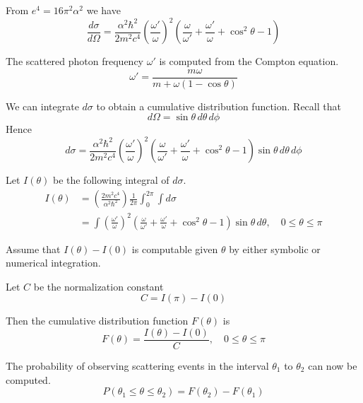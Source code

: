 \documentclass[12pt]{article}
\begin{document}
\noindent
From $e^4=16\pi^2\alpha^2$ we have
\begin{equation*}
\frac{d\sigma}{d\Omega}
=\frac{\alpha^2\hbar^2}{2m^2c^4}
\left(\frac{\omega'}{\omega}\right)^2
\left(
\frac{\omega}{\omega'}+\frac{\omega'}{\omega}+\cos^2\theta-1
\right)
\end{equation*}

\noindent
The scattered photon frequency $\omega'$ is computed from the Compton equation.
\begin{equation*}
\omega'=\frac{m\omega}{m+\omega(1-\cos\theta)}
\end{equation*}

\noindent
We can integrate $d\sigma$ to obtain a cumulative distribution function.
Recall that
\begin{equation*}
d\Omega=\sin\theta\,d\theta\,d\phi
\end{equation*}
Hence
\begin{equation*}
d\sigma
=\frac{\alpha^2\hbar^2}{2m^2c^4}
\left(\frac{\omega'}{\omega}\right)^2
\left(\frac{\omega}{\omega'}+\frac{\omega'}{\omega}+\cos^2\theta-1\right)
\sin\theta\,d\theta\,d\phi
\end{equation*}

\bigskip
\noindent
Let $I(\theta)$ be the following integral of $d\sigma$.
\begin{align*}
I(\theta)
&=\left(\frac{2m^2c^4}{\alpha^2\hbar^2}\right)\frac{1}{2\pi}\int_0^{2\pi}\int d\sigma
\\
&=\int
\left(\frac{\omega'}{\omega}\right)^2
\left(\frac{\omega}{\omega'}+\frac{\omega'}{\omega}+\cos^2\theta-1\right)
\sin\theta\,d\theta,
\quad0\le\theta\le\pi
\end{align*}

\noindent
Assume that $I(\theta)-I(0)$ is computable given $\theta$ by either symbolic or numerical integration.

\bigskip
\noindent
Let $C$ be the normalization constant
\begin{equation*}
C=I(\pi)-I(0)
\end{equation*}

\noindent
Then the cumulative distribution function $F(\theta)$ is
\begin{equation*}
F(\theta)=\frac{I(\theta)-I(0)}{C},
\quad0\le\theta\le\pi
\end{equation*}

\noindent
The probability of observing scattering events in the interval
$\theta_1$ to $\theta_2$ can now be computed.
\begin{equation*}
P(\theta_1\le\theta\le\theta_2)=F(\theta_2)-F(\theta_1)
\end{equation*}
\end{document}
